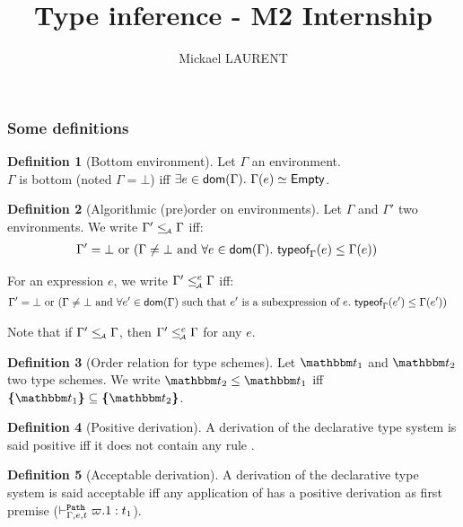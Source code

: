 \documentclass[a4paper]{article}
\title{\vspace{1.5cm}Type inference - M2 Internship}
\author{Mickael LAURENT}
\date{\vspace{-5ex}}
\theoremstyle{definition}
\newtheorem{definition}{Definition}
\begin{document}
  \maketitle

  \subsubsection{Some definitions}

    \begin{definition}[Bottom environment]
      Let $\Gamma$ an environment.\\
      $\Gamma$ is bottom (noted $\Gamma = \bot$) iff $\exists e\in\dom\Gamma.\ \Gamma(e)\simeq\Empty$.
    \end{definition}

    \begin{definition}[Algorithmic (pre)order on environments]
    Let $\Gamma$ and $\Gamma'$ two environments. We write $\Gamma' \leq_{\!\scriptscriptstyle\mathcal{A}} \Gamma$ iff:
    \begin{align*}
        &\Gamma'=\bot \text{ or } (\Gamma\neq\bot \text{ and } \forall e \in \textsf{dom}(\Gamma).\ \textsf{typeof}_{\Gamma}(e) \leq \Gamma(e))
    \end{align*}

    For an expression $e$, we write $\Gamma' \leq_{\!\scriptscriptstyle\mathcal{A}}^e \Gamma$ iff:
    \begin{align*}
      &\Gamma'=\bot \text{ or } (\Gamma\neq\bot \text{ and } \forall e' \in \dom \Gamma \text{ such that $e'$ is a subexpression of $e$}.\ \tyof {e'} \Gamma \leq \Gamma({e'}))
    \end{align*}

    Note that if $\Gamma' \leq_{\!\scriptscriptstyle\mathcal{A}} \Gamma$, then $\Gamma' \leq_{\!\scriptscriptstyle\mathcal{A}}^e \Gamma$ for any $e$.
    \end{definition}

    \begin{definition}[Order relation for type schemes]
      Let $\ts_1$ and $\ts_2$ two type schemes. We write $\ts_2 \leq \ts_1$ iff $\tsint {\ts_1} \subseteq \tsint{\ts_2}$.
    \end{definition}

    \begin{definition}[Positive derivation]
      A derivation of the declarative type system is said positive iff it does not contain any rule .
    \end{definition}

    \begin{definition}[Acceptable derivation]
      A derivation of the declarative type system is said acceptable iff any application of 
      has a positive derivation as first premise ($\vdash^{\texttt{Path}}_{\Gamma,e,t} \varpi.1:t_1$).
    \end{definition}
\end{document}

